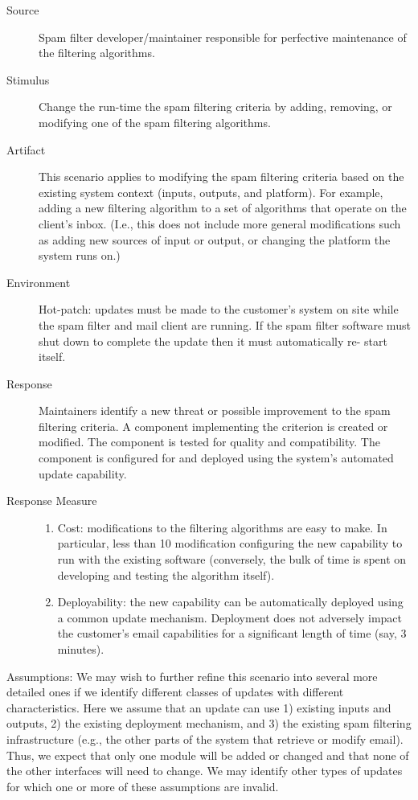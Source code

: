 \documentclass[letterpaper,11pt]{article}
\begin{document}
\begin{description}
\item[Source] Spam filter developer/maintainer responsible for perfective
  maintenance of the filtering algorithms.
\item[Stimulus] Change the run-time the spam filtering criteria by adding,
  removing, or modifying one of the spam filtering algorithms.
\item[Artifact] This scenario applies to modifying the spam filtering criteria
  based on the existing system context (inputs, outputs, and platform). For
  example, adding a new filtering algorithm to a set of algorithms that
  operate on the client’s inbox. (I.e., this does not include more general
  modifications such as adding new sources of input or output, or changing the
  platform the system runs on.)
\item[Environment] Hot-patch: updates must be made to the customer’s system on
  site while the spam filter and mail client are running. If the spam filter
  software must shut down to complete the update then it must automatically
  re- start itself.
\item[Response] Maintainers identify a new threat or possible improvement to
  the spam filtering criteria. A component implementing the criterion is
  created or modified. The component is tested for quality and
  compatibility. The component is configured for and deployed using the
  system’s automated update capability.
\item[Response Measure] \hfill
  \begin{enumerate}
  \item Cost: modifications to the filtering algorithms are easy to make.  In
    particular, less than 10%
    modification configuring the new capability to run with the existing
    software (conversely, the bulk of time is spent on developing and testing
    the algorithm itself).
  \item Deployability: the new capability can be automatically deployed using a
    common update mechanism. Deployment does not adversely impact the customer’s
    email capabilities for a significant length of time (say, 3 minutes).
  \end{enumerate}
\end{description}
 
Assumptions: We may wish to further refine this scenario into several more
detailed ones if we identify different classes of updates with different
characteristics. Here we assume that an update can use 1) existing inputs and
outputs, 2) the existing deployment mechanism, and 3) the existing spam
filtering infrastructure (e.g., the other parts of the system that retrieve or
modify email). Thus, we expect that only one module will be added or changed
and that none of the other interfaces will need to change. We may identify
other types of updates for which one or more of these assumptions are invalid.
\end{document}
